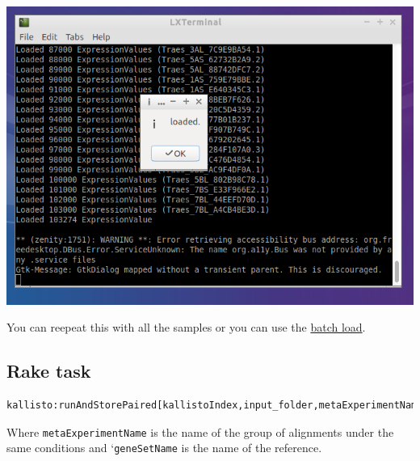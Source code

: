 \begin{enumerate}
  \includegraphics{images/RunKallisto08.png}
\end{enumerate}

You can reepeat this with all the samples or you can use the
\href{RunKallistoBatch}{batch load}.

\subsection{Rake task}\label{rake-task}

\begin{lstlisting}[language=sh]
kallisto:runAndStorePaired[kallistoIndex,input_folder,metaExperimentName,geneSetName]
\end{lstlisting}

Where \lstinline!metaExperimentName! is the name of the group of
alignments under the same conditions and `\lstinline!geneSetName! is the
name of the reference.
